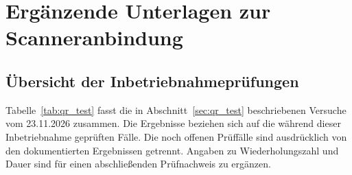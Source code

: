 \section{Ergänzende Unterlagen zur Scanneranbindung}
\label{sec:anhang_qr}

\subsection{Übersicht der Inbetriebnahmeprüfungen}
\label{sec:anhang_qr_tests}

Tabelle~\ref{tab:qr_test} fasst die in Abschnitt~\ref{sec:qr_test} beschriebenen Versuche vom 23.11.2026 zusammen. Die Ergebnisse beziehen sich auf die während dieser Inbetriebnahme geprüften Fälle. Die noch offenen Prüffälle sind ausdrücklich von den dokumentierten Ergebnissen getrennt. Angaben zu Wiederholungszahl und Dauer sind für einen abschließenden Prüfnachweis zu ergänzen.

